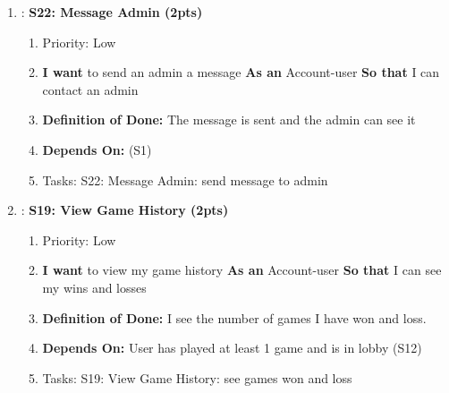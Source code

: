 \begin{enumerate}[nosep]
    \item: \textbf{S22: Message Admin (2pts)}
    \begin{enumerate}[nosep]
        \item Priority: Low 
        \item \textbf{I want} to send an admin a message \textbf{As an} Account-user \textbf{So that} I can contact an admin
        \item \textbf{Definition of Done:} The message is sent and the admin can see it
        \item \textbf{Depends On:} (S1)
        \item Tasks: S22: Message Admin: send message to admin
    \end{enumerate}


    \item: \textbf{S19: View Game History (2pts)}
    \begin{enumerate}[nosep]
        \item Priority: Low
        \item \textbf{I want} to view my game history \textbf{As an} Account-user \textbf{So that} I can see my wins and losses
        \item \textbf{Definition of Done:} I see the number of games I have won and loss.
        \item \textbf{Depends On:} User has played at least 1 game and is in lobby (S12)
        \item Tasks: S19: View Game History: see games won and loss
    \end{enumerate}
    
\end{enumerate}

